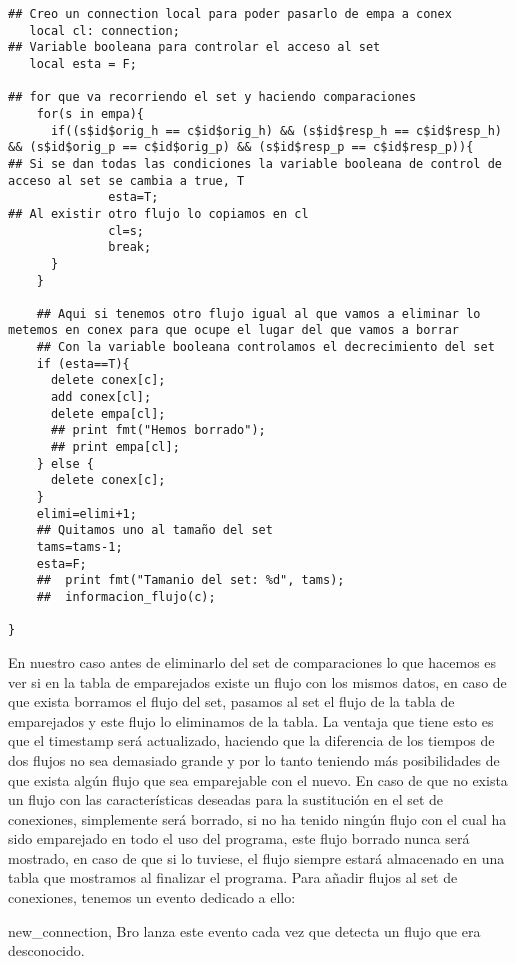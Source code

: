 \begin{lstlisting}[language=Consola]
## Creo un connection local para poder pasarlo de empa a conex
   local cl: connection;
## Variable booleana para controlar el acceso al set
   local esta = F;

## for que va recorriendo el set y haciendo comparaciones
    for(s in empa){
      if((s$id$orig_h == c$id$orig_h) && (s$id$resp_h == c$id$resp_h) && (s$id$orig_p == c$id$orig_p) && (s$id$resp_p == c$id$resp_p)){
## Si se dan todas las condiciones la variable booleana de control de acceso al set se cambia a true, T
              esta=T;
## Al existir otro flujo lo copiamos en cl
              cl=s;
              break;
      }
    }

    ## Aqui si tenemos otro flujo igual al que vamos a eliminar lo metemos en conex para que ocupe el lugar del que vamos a borrar
    ## Con la variable booleana controlamos el decrecimiento del set
    if (esta==T){
      delete conex[c];
      add conex[cl];
      delete empa[cl];
      ## print fmt("Hemos borrado");
      ## print empa[cl];
    } else {
      delete conex[c];
    }
    elimi=elimi+1;
    ## Quitamos uno al tamaño del set
    tams=tams-1;
    esta=F;
    ##  print fmt("Tamanio del set: %d", tams);
    ##  informacion_flujo(c);

}
\end{lstlisting}
\intro
En nuestro caso antes de eliminarlo del set de comparaciones 
lo que hacemos es ver si en la tabla de emparejados existe un 
flujo con los mismos datos, en caso de que exista borramos el 
flujo del set, pasamos al set el flujo de la tabla de emparejados 
y este flujo lo eliminamos de la tabla. La ventaja que tiene 
esto es que el timestamp será actualizado, haciendo que la 
diferencia de los tiempos de dos flujos no sea demasiado grande 
y por lo tanto teniendo más posibilidades de que exista algún 
flujo que sea emparejable con el nuevo. En caso de que no exista 
un flujo con las características deseadas para la sustitución en 
el set de conexiones, simplemente será borrado, si no ha tenido 
ningún flujo con el cual ha sido emparejado en todo el uso del 
programa, este flujo borrado nunca será mostrado, en caso de que 
si lo tuviese, el flujo siempre estará almacenado en una tabla 
que mostramos al finalizar el programa.
\intro
Para añadir flujos al set de conexiones, tenemos un evento 
dedicado a ello:
\intro
\begin{itemsize}
\item new_connection, Bro lanza este evento cada vez que detecta un flujo que era desconocido.
\end{itemsize}
